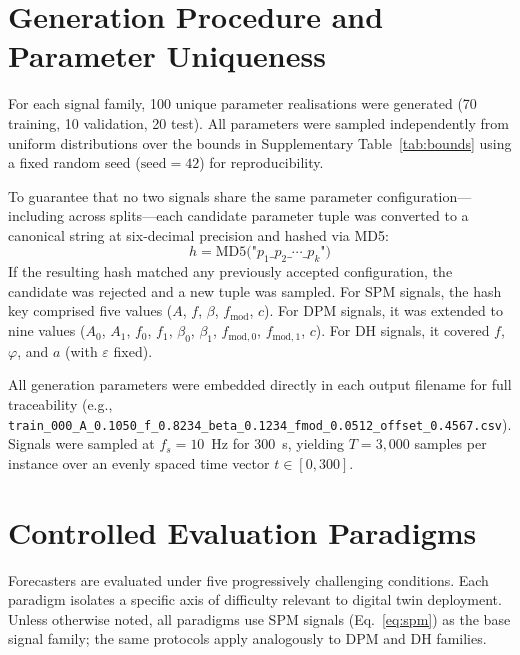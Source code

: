 \documentclass[11pt]{article}
\begin{document}
\section{Generation Procedure and Parameter Uniqueness}
\label{sec:generation}

For each signal family, 100 unique parameter realisations were generated (70 training, 10 validation, 20 test). All parameters were sampled independently from uniform distributions over the bounds in Supplementary Table~\ref{tab:bounds} using a fixed random seed ($\mathrm{seed} = 42$) for reproducibility.

To guarantee that no two signals share the same parameter configuration---including across splits---each candidate parameter tuple was converted to a canonical string at six-decimal precision and hashed via MD5:
\begin{equation}
    h = \mathrm{MD5}\!\bigl(\texttt{"}p_1\texttt{\_}p_2\texttt{\_}\cdots\texttt{\_}p_k\texttt{"}\bigr)
    \label{eq:hash}
\end{equation}
If the resulting hash matched any previously accepted configuration, the candidate was rejected and a new tuple was sampled. For SPM signals, the hash key comprised five values ($A$, $f$, $\beta$, $f_{\mathrm{mod}}$, $c$). For DPM signals, it was extended to nine values ($A_0$, $A_1$, $f_0$, $f_1$, $\beta_0$, $\beta_1$, $f_{\mathrm{mod},0}$, $f_{\mathrm{mod},1}$, $c$). For DH signals, it covered $f$, $\varphi$, and $a$ (with $\varepsilon$ fixed).

All generation parameters were embedded directly in each output filename for full traceability (e.g., \texttt{train\_000\_A\_0.1050\_f\_0.8234\_beta\_0.1234\_fmod\_0.0512\_offset\_0.4567.csv}). Signals were sampled at $f_s = 10$~Hz for 300~s, yielding $T = 3{,}000$ samples per instance over an evenly spaced time vector $t \in [0, 300]$.

\section{Controlled Evaluation Paradigms}
\label{sec:paradigms}

Forecasters are evaluated under five progressively challenging conditions. Each paradigm isolates a specific axis of difficulty relevant to digital twin deployment. Unless otherwise noted, all paradigms use SPM signals (Eq.~\eqref{eq:spm}) as the base signal family; the same protocols apply analogously to DPM and DH families.
\end{document}
